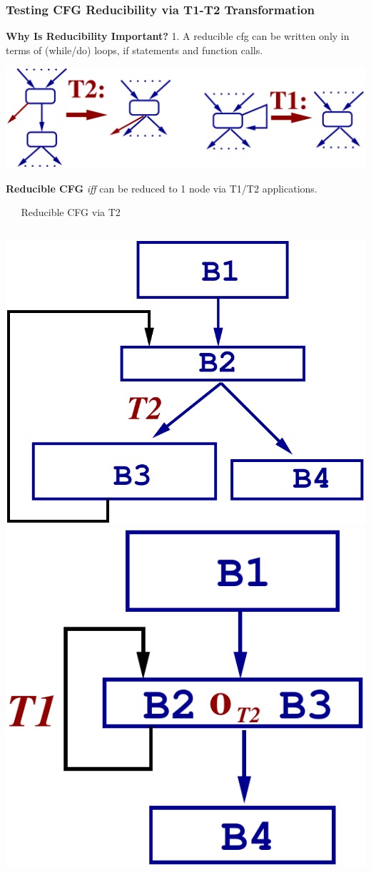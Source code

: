 \documentclass{beamer}
\begin{document}
\begin{frame}[fragile,t]
    \frametitle{Testing CFG Reducibility via T1-T2 Transformation}

{\bf Why Is Reducibility Important?} 1. A reducible {\sc cfg} can be written
only in terms of (while/do) loops, if statements and function calls.

\bigskip

\includegraphics[width=44ex]{Figures/CFG_T12}

{\bf Reducible CFG} {\em iff} can be reduced to 1 node via T1/T2 applications.\smallskip

\begin{block}{{\tt~~~}Reducible CFG via T2}
\begin{columns}
\includegraphics[width=15ex]{Figures/CFGred1}
\includegraphics[width=11ex]{Figures/CFGred2}
\end{columns}
\end{block}

\end{frame}
\end{document}
